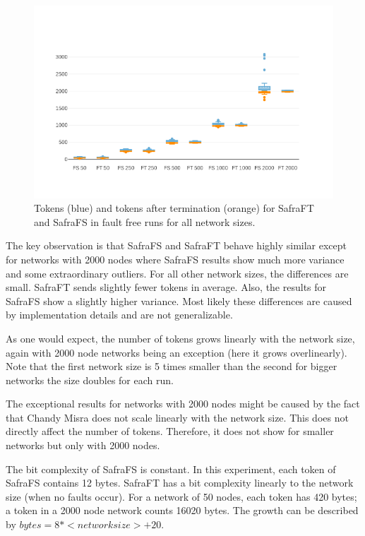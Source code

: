 \begin{figure}
	\includegraphics{figures/tokens-and-tokens-after.png}
	\caption{Tokens (blue) and tokens after termination (orange) for SafraFT and SafraFS in fault free runs for all network sizes.}
	\label{fig:tokens-and-tokens-after}
\end{figure}

The key observation is that SafraFS and SafraFT behave highly similar except for networks with 2000 nodes where SafraFS results show much more variance and some extraordinary outliers.
For all other network sizes, the differences are small.
SafraFT sends slightly fewer tokens in average.
Also, the results for SafraFS show a slightly higher variance.
Most likely these differences are caused by implementation details and are not generalizable.

As one would expect, the number of tokens grows linearly with the network size, again with 2000 node networks being an exception (here it grows overlinearly).
Note that the first network size is 5 times smaller than the second for bigger networks the size doubles for each run.

The exceptional results for networks with 2000 nodes might be caused by the fact that Chandy Misra does not scale linearly with the network size. 
This does not directly affect the number of tokens. 
Therefore, it does not show for smaller networks but only with 2000 nodes.

The bit complexity of SafraFS is constant.
In this experiment, each token of SafraFS contains 12 bytes.
SafraFT has a bit complexity linearly to the network size (when no faults occur).
For a network of 50 nodes, each token has 420 bytes; a token in a 2000 node network counts 16020 bytes.
The growth can be described by $bytes = 8 * <network size> + 20$.

